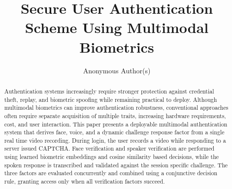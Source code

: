 \documentclass[runningheads]{llncs}
\begin{document}
\title{Secure User Authentication Scheme Using Multimodal Biometrics}

\author{Anonymous Author(s)}

\maketitle

\begin{abstract}
Authentication systems increasingly require stronger protection against credential theft, replay, and biometric spoofing while remaining practical to deploy. Although multimodal biometrics can improve authentication robustness, conventional approaches often require separate acquisition of multiple traits, increasing hardware requirements, cost, and user interaction. This paper presents a deployable multimodal authentication system that derives face, voice, and a dynamic challenge response factor from a single real time video recording. During login, the user records a video while responding to a server issued CAPTCHA. Face verification and speaker verification are performed using learned biometric embeddings and cosine similarity based decisions, while the spoken response is transcribed and validated against the session specific challenge. The three factors are evaluated concurrently and combined using a conjunctive decision rule, granting access only when all verification factors succeed.


\end{abstract}
\end{document}
